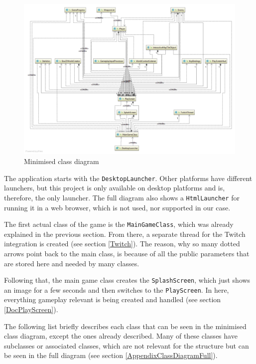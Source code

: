 \documentclass[12p]{article}
\begin{document}
\begin{figure}[ht]
  \centering
  \includegraphics[width=1\textwidth]{Documentation/class_diagram_minimized.png}
  \caption{Minimised class diagram}
  \label{fig:minClassDiagram}
\end{figure}

The application starts with the \texttt{DesktopLauncher}. Other platforms have different launchers, but this project is only available on desktop platforms and is, therefore, the only launcher. The full diagram also shows a \texttt{HtmlLauncher} for running it in a web browser, which is not used, nor supported in our case.

The first actual class of the game is the \texttt{MainGameClass}, which was already explained in the previous section. From there, a separate thread for the Twitch integration is created (see section \ref{Twitch}). The reason, why so many dotted arrows point back to the main class, is because of all the public parameters that are stored here and needed by many classes.

Following that, the main game class creates the \texttt{SplashScreen}, which just shows an image for a few seconds and then switches to the \texttt{PlayScreen}. In here, everything gameplay relevant is being created and handled (see section \ref{DocPlayScreen}). 

The following list briefly describes each class that can be seen in the minimised class diagram, except the ones already described. Many of these classes have subclasses or associated classes, which are not relevant for the structure but can be seen in the full diagram (see section \ref{AppendixClassDiagramFull}).
\end{document}
